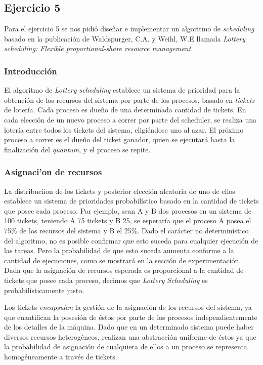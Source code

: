 \subsection{Ejercicio 5}

Para el ejercicio 5 se nos pidi\'o dise\~nar e implementar un algoritmo de \textit{scheduling} basado en la publicaci\'on de Waldspurger, C.A. y Weihl, W.E llamada \textit{Lottery scheduling: Flexible proportional-share resource management}.

\subsubsection{Introducci\'on}

El algoritmo de \textit{Lottery scheduling} establece un sistema de prioridad para la obtenci\'on de los recursos del sistema por parte de los procesos, basado en \textit{tickets} de loter\'ia. Cada proceso es due\~no de una determinada cantidad de tickets. En cada elecci\'on de un nuevo proceso a correr por parte del scheduler, se realiza una loter\'ia entre todos los tickets del sistema, eligi\'endose uno al azar. El pr\'oximo proceso a correr es el due\~no del ticket ganador, quien se ejecutar\'a hasta la finalizaci\'on del \textit{quantum}, y el proceso se repite.

\subsubsection{Asignaci'on de recursos}

La distribuci\'ion de los tickets y posterior elecci\'on aleatoria de uno de ellos establece un sistema de prioridades probabil\'istico basado en la cantidad de tickets que posee cada proceso. Por ejemplo, sean A y B dos procesos en un sistema de 100 tickets, teniendo A 75 tickets y B 25, se esperar\'ia que el proceso A posea el 75\% de los recursos del sistema y B el 25\%. Dado el car\'acter no determin\'istico del algoritmo, no es posible confirmar que esto suceda para cualquier ejecuci\'on de las tareas. Pero la probabilidad de que esto suceda aumenta conforme a la cantidad de ejecuciones, como se mostrar\'a en la secci\'on de experimentaci\'on. Dada que la asignaci\'on de recursos esperada es proporcional a la cantidad de tickets que posee cada proceso, decimos que \textit{Lottery Scheduling} es probabil\'isticamente justo.

Los tickets \textit{encapsulan} la gesti\'on de la asignaci\'on de los recursos del sistema, ya que cuantifican la posesi\'on de \'estos por parte de los procesos independientemente de los detalles de la m\'aquina. Dado que en un determinado sistema puede haber diversos recursos heterog\'eneos, realizan una abstracci\'on uniforme de \'estos ya que la probabilidad de asignaci\'on de cualquiera de ellos a un proceso se representa homog\'eneamente a trav\'es de tickets. 

